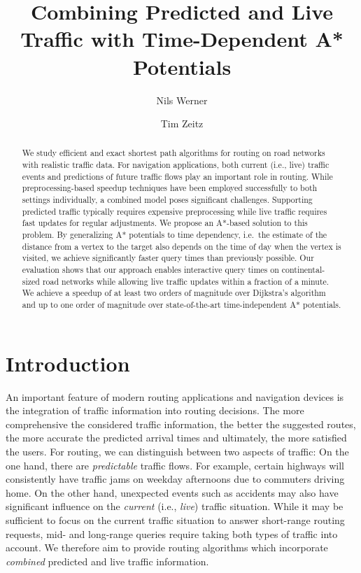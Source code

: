 \documentclass[a4paper,UKenglish,cleveref, autoref, thm-restate,anonymous]{lipics-v2021}
\title{Combining Predicted and Live Traffic with Time-Dependent A* Potentials}
\author{Nils Werner}{Karlsruhe Institute of Technology, Germany}{}{}{}
\author{Tim Zeitz}{Karlsruhe Institute of Technology, Germany}{tim.zeitz@kit.edu}{https://orcid.org/0000-0003-4746-3582}{}
\begin{document}
\maketitle

\begin{abstract}
We study efficient and exact shortest path algorithms for routing on road networks with realistic traffic data.
For navigation applications, both current (i.e., live) traffic events and predictions of future traffic flows play an important role in routing.
While preprocessing-based speedup techniques have been employed successfully to both settings individually, a combined model poses significant challenges.
Supporting predicted traffic typically requires expensive preprocessing while live traffic requires fast updates for regular adjustments.
We propose an A*-based solution to this problem.
By generalizing A* potentials to time dependency, i.e.\ the estimate of the distance from a vertex to the target also depends on the time of day when the vertex is visited, we achieve significantly faster query times than previously possible.
Our evaluation shows that our approach enables interactive query times on continental-sized road networks while allowing live traffic updates within a fraction of a minute.
We achieve a speedup of at least two orders of magnitude over Dijkstra's algorithm and up to one order of magnitude over state-of-the-art time-independent A* potentials.
\end{abstract}

\section{Introduction}

An important feature of modern routing applications and navigation devices is the integration of traffic information into routing decisions.
The more comprehensive the considered traffic information, the better the suggested routes, the more accurate the predicted arrival times and ultimately, the more satisfied the users.
For routing, we can distinguish between two aspects of traffic:
On the one hand, there are \emph{predictable} traffic flows.
For example, certain highways will consistently have traffic jams on weekday afternoons due to commuters driving home.
On the other hand, unexpected events such as accidents may also have significant influence on the \emph{current} (i.e., \emph{live}) traffic situation.
While it may be sufficient to focus on the current traffic situation to answer short-range routing requests, mid- and long-range queries require taking both types of traffic into account.
We therefore aim to provide routing algorithms which incorporate \emph{combined} predicted and live traffic information.
\end{document}
